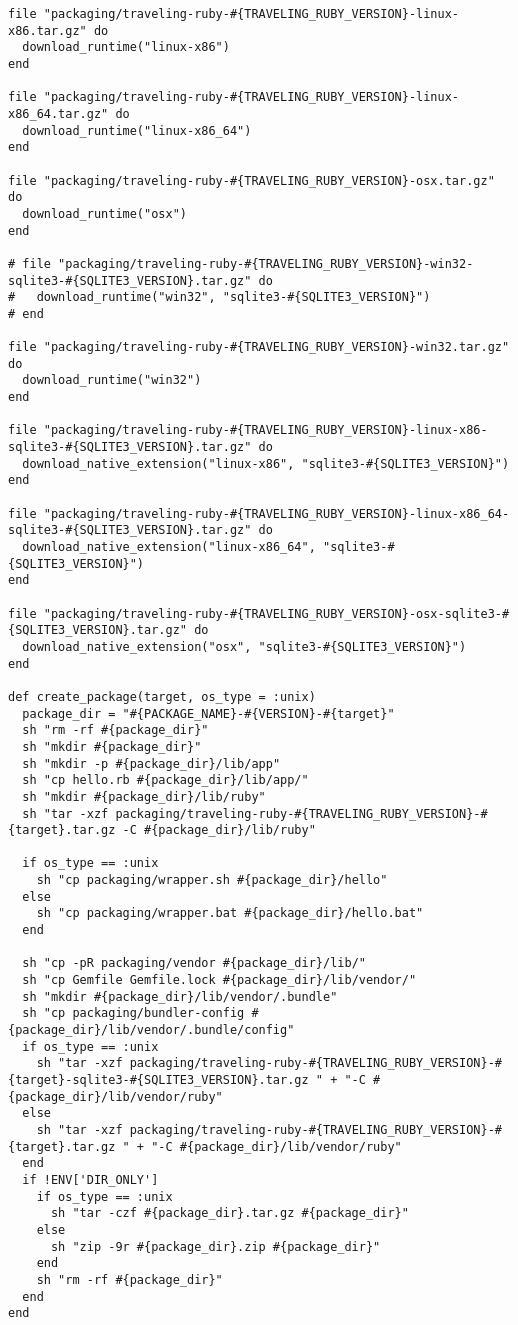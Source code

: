 \documentclass[11pt]{article}
\begin{document}
\begin{verbatim}
file "packaging/traveling-ruby-#{TRAVELING_RUBY_VERSION}-linux-x86.tar.gz" do
  download_runtime("linux-x86")
end

file "packaging/traveling-ruby-#{TRAVELING_RUBY_VERSION}-linux-x86_64.tar.gz" do
  download_runtime("linux-x86_64")
end

file "packaging/traveling-ruby-#{TRAVELING_RUBY_VERSION}-osx.tar.gz" do
  download_runtime("osx")
end

# file "packaging/traveling-ruby-#{TRAVELING_RUBY_VERSION}-win32-sqlite3-#{SQLITE3_VERSION}.tar.gz" do
#   download_runtime("win32", "sqlite3-#{SQLITE3_VERSION}")
# end

file "packaging/traveling-ruby-#{TRAVELING_RUBY_VERSION}-win32.tar.gz" do
  download_runtime("win32")
end

file "packaging/traveling-ruby-#{TRAVELING_RUBY_VERSION}-linux-x86-sqlite3-#{SQLITE3_VERSION}.tar.gz" do
  download_native_extension("linux-x86", "sqlite3-#{SQLITE3_VERSION}")
end

file "packaging/traveling-ruby-#{TRAVELING_RUBY_VERSION}-linux-x86_64-sqlite3-#{SQLITE3_VERSION}.tar.gz" do
  download_native_extension("linux-x86_64", "sqlite3-#{SQLITE3_VERSION}")
end

file "packaging/traveling-ruby-#{TRAVELING_RUBY_VERSION}-osx-sqlite3-#{SQLITE3_VERSION}.tar.gz" do
  download_native_extension("osx", "sqlite3-#{SQLITE3_VERSION}")
end

def create_package(target, os_type = :unix)
  package_dir = "#{PACKAGE_NAME}-#{VERSION}-#{target}"
  sh "rm -rf #{package_dir}"
  sh "mkdir #{package_dir}"
  sh "mkdir -p #{package_dir}/lib/app"
  sh "cp hello.rb #{package_dir}/lib/app/"
  sh "mkdir #{package_dir}/lib/ruby"
  sh "tar -xzf packaging/traveling-ruby-#{TRAVELING_RUBY_VERSION}-#{target}.tar.gz -C #{package_dir}/lib/ruby"

  if os_type == :unix
    sh "cp packaging/wrapper.sh #{package_dir}/hello"
  else
    sh "cp packaging/wrapper.bat #{package_dir}/hello.bat"
  end

  sh "cp -pR packaging/vendor #{package_dir}/lib/"
  sh "cp Gemfile Gemfile.lock #{package_dir}/lib/vendor/"
  sh "mkdir #{package_dir}/lib/vendor/.bundle"
  sh "cp packaging/bundler-config #{package_dir}/lib/vendor/.bundle/config"
  if os_type == :unix
    sh "tar -xzf packaging/traveling-ruby-#{TRAVELING_RUBY_VERSION}-#{target}-sqlite3-#{SQLITE3_VERSION}.tar.gz " + "-C #{package_dir}/lib/vendor/ruby"
  else
    sh "tar -xzf packaging/traveling-ruby-#{TRAVELING_RUBY_VERSION}-#{target}.tar.gz " + "-C #{package_dir}/lib/vendor/ruby"
  end
  if !ENV['DIR_ONLY']
    if os_type == :unix
      sh "tar -czf #{package_dir}.tar.gz #{package_dir}"
    else
      sh "zip -9r #{package_dir}.zip #{package_dir}"
    end
    sh "rm -rf #{package_dir}"
  end
end


\end{verbatim}
\end{document}
